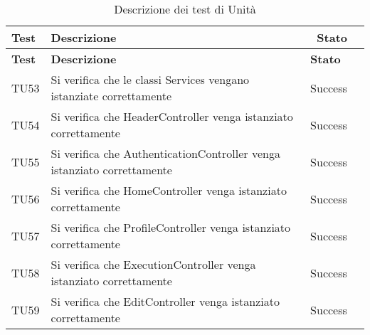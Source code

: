 	 \begin{longtable} [c]{| p{2cm} | p{6cm} |p{3cm} | p{2cm} |}
		 			\caption{Descrizione dei test di Unità \label{tab:verTestUnit}}\\
	 		 \hline
	 		 \textbf{Test} & \textbf{Descrizione} & \ \textbf{Stato} \\
	 		 \hline
	 		 \endfirsthead
	 		 \hline
	 		 \textbf{Test} & \textbf{Descrizione} & \textbf{Stato} \\
	 		 \hline
		 			\endhead
	 		 \hline
	 		 \endfoot
	 		 \hline
	 		 \endlastfoot
          TU53 & Si verifica che le classi Services vengano istanziate correttamente & Success \\
          \hline
          TU54 & Si verifica che HeaderController venga istanziato correttamente & Success \\
          \hline 
          TU55 & Si verifica che AuthenticationController venga istanziato correttamente & Success\\
          \hline
          TU56 & Si verifica che HomeController venga istanziato correttamente & Success \\
          \hline
          TU57 & Si verifica che ProfileController venga istanziato correttamente & Success \\
          \hline
          TU58 & Si verifica che ExecutionController venga istanziato correttamente & Success \\
          \hline
          TU59 & Si verifica che EditController venga istanziato correttamente & Success \\
		 		\end{longtable}
		 		
